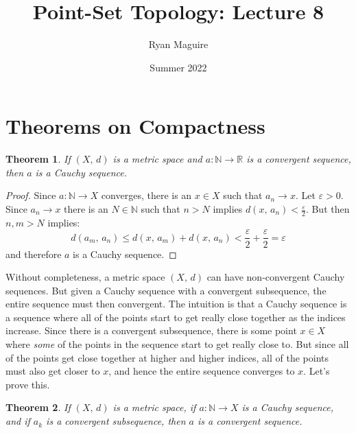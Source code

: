 \documentclass{article}
\title{Point-Set Topology: Lecture 8}
\author{Ryan Maguire}
\date{Summer 2022}
\theoremstyle{plain}
\newtheorem{theorem}{Theorem}[section]
\theoremstyle{normal}
\begin{document}
    \maketitle
    \section{Theorems on Compactness}
        \begin{theorem}
            If $(X,\,d)$ is a metric space and
            $a:\mathbb{N}\rightarrow\mathbb{R}$ is a convergent sequence,
            then $a$ is a Cauchy sequence.
        \end{theorem}
        \begin{proof}
            Since $a:\mathbb{N}\rightarrow{X}$ converges, there is an
            $x\in{X}$ such that $a_{n}\rightarrow{x}$. Let
            $\varepsilon>0$. Since $a_{n}\rightarrow{x}$ there is an
            $N\in\mathbb{N}$ such that $n>N$ implies
            $d(x,\,a_{n})<\frac{\varepsilon}{2}$. But then $n,m>N$ implies:
            \begin{equation}
                d(a_{m},\,a_{n})\leq{d}(x,\,a_{m})+d(x,\,a_{n})
                    <\frac{\varepsilon}{2}+\frac{\varepsilon}{2}
                    =\varepsilon
            \end{equation}
            and therefore $a$ is a Cauchy sequence.
        \end{proof}
        Without completeness, a metric space $(X,\,d)$ can have non-convergent
        Cauchy sequences. But given a Cauchy sequence with a convergent
        subsequence, the entire sequence must then convergent. The intuition is
        that a Cauchy sequence is a sequence where all of the points start to
        get really close together as the indices increase. Since there is a
        convergent subsequence, there is some point $x\in{X}$ where
        \textit{some} of the points in the sequence start to get really close
        to. But since all of the points get close together at higher and higher
        indices, all of the points must also get closer to $x$, and hence the
        entire sequence converges to $x$. Let's prove this.
        \begin{theorem}
            If $(X,\,d)$ is a metric space, if $a:\mathbb{N}\rightarrow{X}$
            is a Cauchy sequence, and if $a_{k}$ is a convergent subsequence,
            then $a$ is a convergent sequence.
        \end{theorem}
\end{document}
